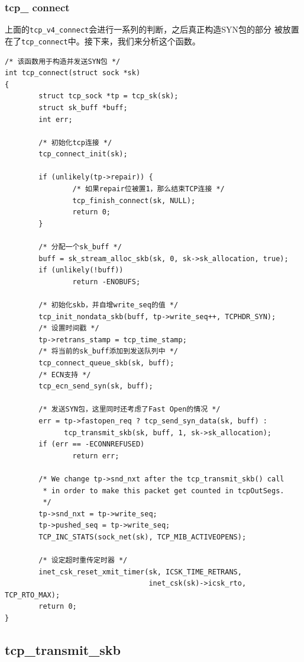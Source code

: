 \documentclass[11pt, a4paper,oneside]{book}
\theoremstyle{ocrenumbox}
\theoremstyle{purplenumbox}
\theoremstyle{blackbox}
\begin{document}
\subsubsection{tcp\_ connect}
上面的\texttt{tcp_v4_connect}会进行一系列的判断，之后真正构造SYN包的部分
被放置在了\texttt{tcp_connect}中。接下来，我们来分析这个函数。

\begin{verbatim}
/* 该函数用于构造并发送SYN包 */
int tcp_connect(struct sock *sk)
{
        struct tcp_sock *tp = tcp_sk(sk);
        struct sk_buff *buff;
        int err;

        /* 初始化tcp连接 */
        tcp_connect_init(sk);

        if (unlikely(tp->repair)) {
                /* 如果repair位被置1，那么结束TCP连接 */
                tcp_finish_connect(sk, NULL);
                return 0;
        }

        /* 分配一个sk_buff */
        buff = sk_stream_alloc_skb(sk, 0, sk->sk_allocation, true);
        if (unlikely(!buff))
                return -ENOBUFS;

        /* 初始化skb，并自增write_seq的值 */
        tcp_init_nondata_skb(buff, tp->write_seq++, TCPHDR_SYN);
        /* 设置时间戳 */
        tp->retrans_stamp = tcp_time_stamp;
        /* 将当前的sk_buff添加到发送队列中 */
        tcp_connect_queue_skb(sk, buff);
        /* ECN支持 */
        tcp_ecn_send_syn(sk, buff);

        /* 发送SYN包，这里同时还考虑了Fast Open的情况 */
        err = tp->fastopen_req ? tcp_send_syn_data(sk, buff) :
              tcp_transmit_skb(sk, buff, 1, sk->sk_allocation);
        if (err == -ECONNREFUSED)
                return err;

        /* We change tp->snd_nxt after the tcp_transmit_skb() call
         * in order to make this packet get counted in tcpOutSegs.
         */
        tp->snd_nxt = tp->write_seq;
        tp->pushed_seq = tp->write_seq;
        TCP_INC_STATS(sock_net(sk), TCP_MIB_ACTIVEOPENS);

        /* 设定超时重传定时器 */
        inet_csk_reset_xmit_timer(sk, ICSK_TIME_RETRANS,
                                  inet_csk(sk)->icsk_rto, TCP_RTO_MAX);
        return 0;
}
\end{verbatim}

\subsection{tcp\_transmit\_skb}
\end{document}
